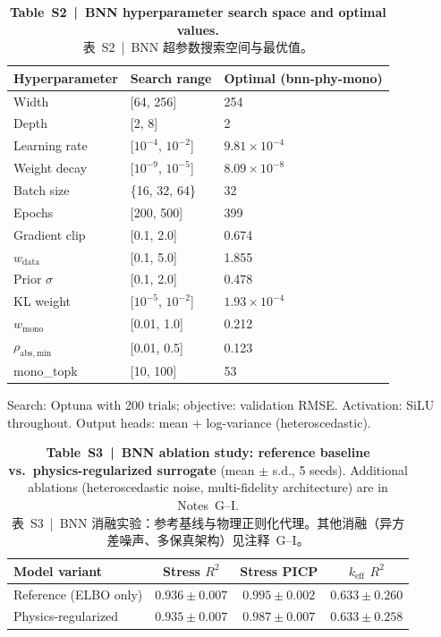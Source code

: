 \documentclass[11pt,a4paper]{article}
\newcommand{\keff}{\ensuremath{k_{\mathrm{eff}}}}
\begin{document}
\begin{table}[htbp]
\centering
\caption{\textbf{Table~S2~|~BNN hyperparameter search space and optimal
values.}\\
\small 表~S2~|~BNN 超参数搜索空间与最优值。}
\label{tab:S2}
\smallskip
\small
\begin{tabular}{lll}
\toprule
Hyperparameter & Search range & Optimal (bnn-phy-mono) \\
\midrule
Width           & [64, 256]           & 254 \\
Depth           & [2, 8]              & 2 \\
Learning rate   & [$10^{-4}$, $10^{-2}$] & $9.81\times10^{-4}$ \\
Weight decay    & [$10^{-9}$, $10^{-5}$] & $8.09\times10^{-8}$ \\
Batch size      & \{16, 32, 64\}      & 32 \\
Epochs          & [200, 500]          & 399 \\
Gradient clip   & [0.1, 2.0]          & 0.674 \\
$w_\mathrm{data}$ & [0.1, 5.0]       & 1.855 \\
Prior $\sigma$  & [0.1, 2.0]          & 0.478 \\
KL weight       & [$10^{-5}$, $10^{-2}$] & $1.93\times10^{-4}$ \\
$w_\mathrm{mono}$ & [0.01, 1.0]      & 0.212 \\
$\rho_\mathrm{abs,min}$ & [0.01, 0.5] & 0.123 \\
mono\_topk      & [10, 100]           & 53 \\
\bottomrule
\end{tabular}

\smallskip
Search: Optuna with 200 trials; objective: validation RMSE.
Activation: SiLU throughout. Output heads: mean + log-variance
(heteroscedastic).
\end{table}

\begin{table}[htbp]
\centering
\caption{\textbf{Table~S3~|~BNN ablation study: reference baseline vs.\
physics-regularized surrogate} (mean $\pm$ s.d., 5 seeds).
Additional ablations (heteroscedastic noise, multi-fidelity architecture)
are in Notes~G--I.\\
\small 表~S3~|~BNN 消融实验：参考基线与物理正则化代理。其他消融（异方差噪声、多保真架构）见注释~G--I。}
\label{tab:S3}
\smallskip
\small
\begin{tabular}{lccc}
\toprule
Model variant & Stress $R^2$ & Stress PICP & \keff{} $R^2$ \\
\midrule
Reference (ELBO only) & $0.936\pm0.007$ & $0.995\pm0.002$ & $0.633\pm0.260$ \\
Physics-regularized   & $0.935\pm0.007$ & $0.987\pm0.007$ & $0.633\pm0.258$ \\
\bottomrule
\end{tabular}
\end{table}
\end{document}
